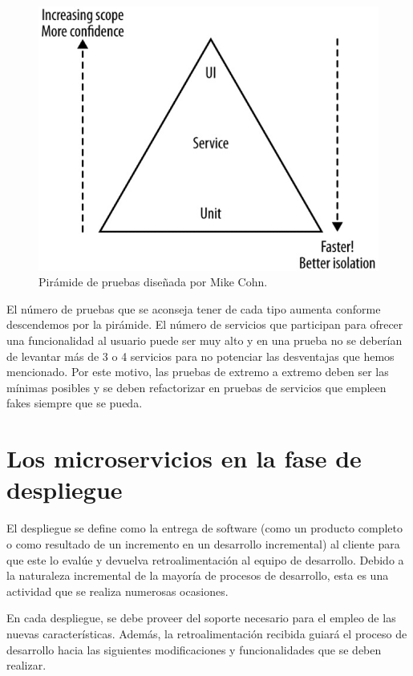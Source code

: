 \documentclass[11pt,spanish,listoffigures]{tfgetsinf}
\begin{document}
\begin{figure}[h]
\centering
\includegraphics[scale=0.5]{Cohn_Pyramid}
\caption{Pirámide de pruebas diseñada por Mike Cohn. \cite{Cohn2010}}
\end{figure}

El número de pruebas que se aconseja tener de cada tipo aumenta conforme descendemos por la pirámide. El número de servicios que participan para ofrecer una funcionalidad al usuario puede ser muy alto y en una prueba no se deberían de levantar más de 3 o 4 servicios para no potenciar las desventajas que hemos mencionado. Por este motivo, las pruebas de extremo a extremo deben ser las mínimas posibles y se deben refactorizar en pruebas de servicios que empleen fakes siempre que se pueda.

\section{Los microservicios en la fase de despliegue}

El despliegue se define como la entrega de software (como un producto completo o como resultado de un incremento en un desarrollo incremental) al cliente para que este lo evalúe y devuelva retroalimentación al equipo de desarrollo. \cite{Pressman} Debido a la naturaleza incremental de la mayoría de procesos de desarrollo, esta es una actividad que se realiza numerosas ocasiones. 

En cada despliegue, se debe proveer del soporte necesario para el empleo de las nuevas características. Además, la retroalimentación recibida guiará el proceso de desarrollo hacia las siguientes modificaciones y funcionalidades que se deben realizar.
\end{document}
